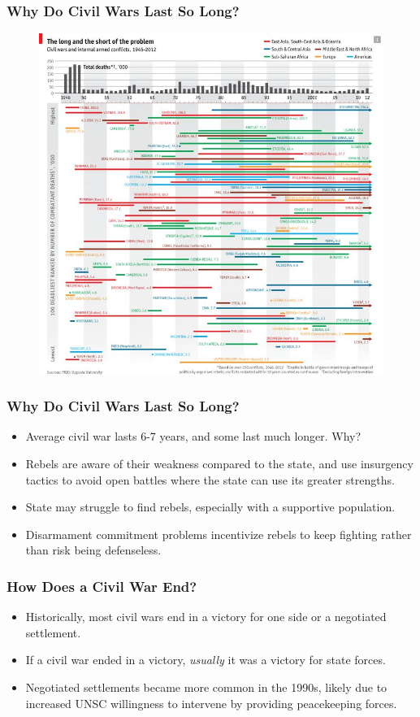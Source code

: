 \documentclass{beamer}
\begin{document}
\begin{frame} 
	\frametitle{\LARGE{Why Do Civil Wars Last So Long?}}
	\begin{figure}[ht!]
		\centering
		\includegraphics[width=\textwidth,height=0.9\textheight,keepaspectratio]{civil war duration.jpg}
	\end{figure}
\end{frame}

\begin{frame} 
	\frametitle{\LARGE{Why Do Civil Wars Last So Long?}}
	\begin{itemize}
		\item Average civil war lasts 6-7 years, and some last much longer. Why? \pause
		\item Rebels are aware of their weakness compared to the state, and use insurgency tactics to avoid open battles where the state can use its greater strengths. \pause
		\item State may struggle to find rebels, especially with a supportive population. \pause
		\item Disarmament commitment problems incentivize rebels to keep fighting rather than risk being defenseless.
	\end{itemize}
\end{frame}

\begin{frame} 
	\frametitle{\LARGE{How Does a Civil War End?}}
	\begin{itemize}
		\item Historically, most civil wars end in a victory for one side or a negotiated settlement. \pause
		\item If a civil war ended in a victory, \textit{usually} it was a victory for state forces. \pause
		\item Negotiated settlements became more common in the 1990s, likely due to increased UNSC willingness to intervene by providing peacekeeping forces.	
	\end{itemize}
\end{frame}
\end{document}
